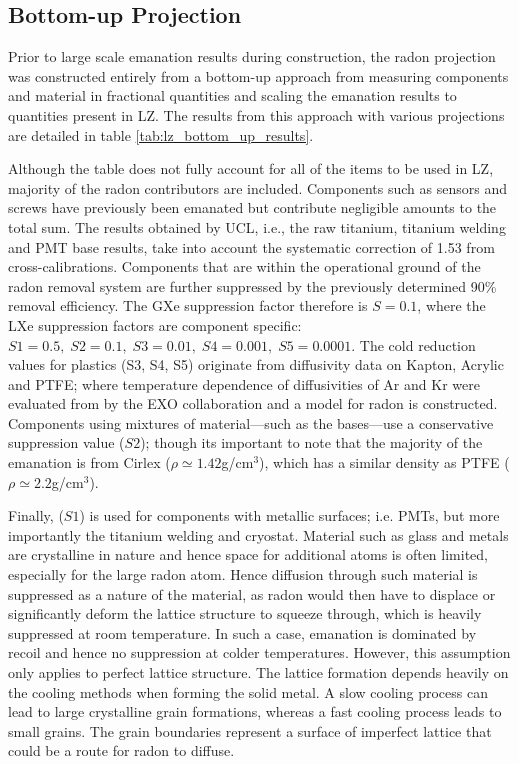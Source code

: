 \subsection{Bottom-up Projection}

Prior to large scale emanation results during construction, the radon projection was constructed entirely from a bottom-up approach from measuring components and material in fractional quantities and scaling the emanation results to quantities present in LZ. The results from this approach with various projections are detailed in table \ref{tab:lz_bottom_up_results}.

Although the table does not fully account for all of the items to be used in LZ, majority of the radon contributors are included. Components such as sensors and screws have previously been emanated but contribute negligible amounts to the total sum. The results obtained by UCL, i.e., the raw titanium, titanium welding and PMT base results, take into account the systematic correction of 1.53 from cross-calibrations. Components that are within the operational ground of the radon removal system are further suppressed by the previously determined 90\% removal efficiency. The GXe suppression factor therefore is $S=0.1$, where the LXe suppression factors are component specific: $S1=0.5,\;S2=0.1,\;S3=0.01,\;S4=0.001,\;S5=0.0001$. The cold reduction values for plastics (S3, S4, S5) originate from diffusivity data on Kapton, Acrylic and PTFE; where temperature dependence of diffusivities of Ar and Kr were evaluated from \cite{Schowalter_2010} by the EXO collaboration and a model for radon is constructed. Components using mixtures of material---such as the bases---use a conservative suppression value ($S2$); though its important to note that the majority of the emanation is from Cirlex ($\rho{}\simeq{}1.42$g/cm$^{3}$), which has a similar density as PTFE ($\rho{}\simeq{}2.2$g/cm$^{3}$). 

Finally, ($S1$) is used for components with metallic surfaces; i.e. PMTs, but more importantly the titanium welding and cryostat. Material such as glass and metals are crystalline in nature and hence space for additional atoms is often limited, especially for the large radon atom. Hence diffusion through such material is suppressed as a nature of the material, as radon would then have to displace or significantly deform the lattice structure to squeeze through, which is heavily suppressed at room temperature. In such a case, emanation is dominated by recoil and hence no suppression at colder temperatures. However, this assumption only applies to perfect lattice structure. The lattice formation depends heavily on the cooling methods when forming the solid metal. A slow cooling process can lead to large crystalline grain formations, whereas a fast cooling process leads to small grains. The grain boundaries represent a surface of imperfect lattice that could be a route for radon to diffuse. 

